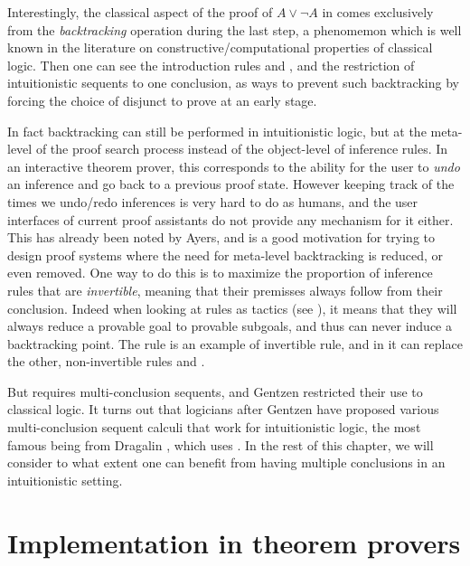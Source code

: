 Interestingly, the classical aspect of the proof of $A \lor \neg A$ in
 comes exclusively from the \emph{backtracking} operation during
the last step, a phenomemon which is well known in the literature on
constructive/computational properties of classical logic.
Then one can see the introduction rules {} and {},
and the restriction of intuitionistic sequents to one conclusion, as ways to
prevent such backtracking by forcing the choice of disjunct to prove at an early
stage.

In fact backtracking can still be performed in intuitionistic logic, but at the
meta-level of the proof search process instead of the object-level of inference
rules. In an interactive theorem prover, this corresponds to the ability for the
user to \emph{undo} an inference and go back to a previous proof state. However
keeping track of the times we undo/redo inferences is very hard to do as humans,
and the user interfaces of current proof assistants do not provide any mechanism
for it either. This has already been noted by Ayers, and is a good motivation for trying to design
proof systems where the need for meta-level backtracking is reduced, or even
removed. One way to do this is to maximize the proportion of inference rules
that are \emph{invertible}, meaning that their premisses always follow from
their conclusion. Indeed when looking at rules as tactics (see ),
it means that they will always reduce a provable goal to provable subgoals, and
thus can never induce a backtracking point. The {} rule is an
example of invertible rule, and in  it can replace the other,
non-invertible rules {} and {}.

But {} requires multi-conclusion sequents, and Gentzen restricted
their use to classical logic. It turns out that logicians after Gentzen have
proposed various multi-conclusion sequent calculi that work for intuitionistic
logic, the most famous being  from Dragalin
, which uses {}. In the rest of
this chapter, we will consider to what extent one can benefit from having
multiple conclusions in an intuitionistic setting.

\section{Implementation in theorem provers}

